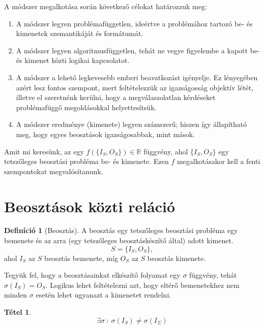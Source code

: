 \documentclass[twocolumn]{article}
\theoremstyle{definition}
\newtheorem{definition}{Definíció}[section]
\newtheorem{theorem}{Tétel}[section]
\newcommand{\set}[1]{ \{ {#1} \} }
\begin{document}
    A módszer megalkotása során következő célokat határozzuk meg:
    \begin{enumerate}
        \item A módszer legyen problémafüggetlen, ideértve a problémához tartozó be- és kimenetek szemantikáját és formátumát.
        \item A módszer legyen algoritmusfüggetlen, tehát ne vegye figyelembe a kapott be- és kimenet közti logikai kapcsolatot.
        \item A módszer a lehető legkevesebb emberi beavatkozást igényelje. Ez lényegében azért lesz fontos szempont, mert feltételezzük az igazságosság objektív létét, illetve el szeretnénk kerülni, hogy a megválaszolatlan kérdéseket problémafüggő megoldásokkal helyettesítsük.
        \item A módszer eredménye (kimenete) legyen számszerű; hiszen így állapítható meg, hogy egyes beosztások igazságosabbak, mint mások.
    \end{enumerate}
    
    Amit mi keresünk, az egy $f( \set{ I_S, O_S }) \in \mathbb{R}$ függvény, ahol $\set{I_S, O_S}$ egy tetszőleges beosztási probléma be- és kimenete. Ezen $f$ megalkotásakor kell a fenti szempontokat megvalósítanunk.

\section{Beosztások közti reláció}
    
    \begin{definition}[Beosztás]
        A beosztás egy tetszőleges beosztási probléma egy bemenete és az arra (egy tetszőleges beosztáskészítő által) adott kimenet.
        \begin{equation} S = \set{I_S, O_S},\end{equation} 
        ahol $I_S$ az $S$ beosztás bemenete, míg $O_S$ az $S$ beosztás kimenete.

    \end{definition}
    
    Tegyük fel, hogy a beosztásainkat elkészítő folyamat egy $\sigma$ függvény, tehát $\sigma(I_S) = O_S$. Logikus lehet feltételezni azt, hogy eltérő bemenetekhez nem minden $\sigma$ esetén lehet ugyanazt a kimenetet rendelni.
    

    \begin{theorem}
        \begin{equation}
            \exists \sigma \ : \ 
            \sigma(I_S)
            \not= 
            \sigma(I_\Sigma)
        \end{equation}
    \end{theorem}
    
\end{document}
